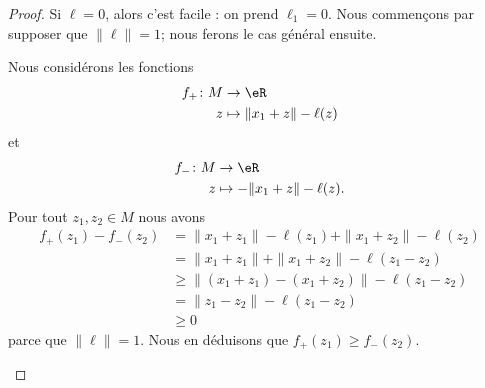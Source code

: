 \begin{proof}
    Si \( \ell=0\), alors c'est facile : on prend \( \ell_1=0\). Nous commençons par supposer que \( \| \ell \|=1\); nous ferons le cas général ensuite.
    \begin{subproof}
        Nous considérons les fonctions
        \begin{equation}
            \begin{aligned}
                f_+\colon M & \to \eR                     \\
                z           & \mapsto \| x_1+z \|-\ell(z)
            \end{aligned}
        \end{equation}
        et
        \begin{equation}
            \begin{aligned}
                f_-\colon M & \to \eR                       \\
                z           & \mapsto -\| x_1+z \|-\ell(z).
            \end{aligned}
        \end{equation}
        Pour tout \( z_1,z_2\in M\) nous avons
        \begin{subequations}
            \begin{align}
                f_+(z_1)-f_-(z_2) & =\| x_1+z_1 \|-\ell(z_1)+\| x_1+z_2 \|-\ell(z_2) \\
                                  & =\| x_1+z_1 \|+\| x_1+z_2 \|-\ell(z_1-z_2)       \\
                                  & \geq \| (x_1+z_1)-(x_1+z_2) \|-\ell(z_1-z_2)     \\
                                  & =\| z_1-z_2  \|-\ell(z_1-z_2)                    \\
                                  & \geq 0
            \end{align}
        \end{subequations}
        parce que \( \| \ell \|=1\). Nous en déduisons que \( f_+(z_1)\geq f_-(z_2)\).



\end{subproof}
\end{proof}
